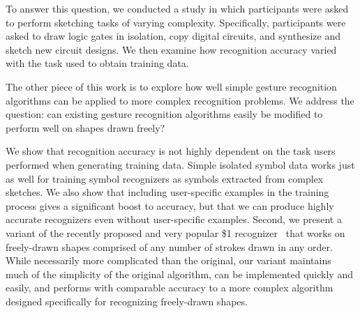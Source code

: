 \documentclass{egpubl}
\begin{document}
To answer this question, we conducted a study in which participants
were asked to perform sketching tasks of varying
complexity. Specifically, participants were asked to draw logic gates
in isolation, copy digital circuits, and synthesize and sketch new
circuit designs.  We then examine how recognition accuracy varied
with the task used to obtain training data.

The other piece of this work is to explore how well simple gesture recognition 
algorithms can be applied to more complex recognition problems.  
We address the question: can existing gesture recognition algorithms easily 
be modified to perform well on shapes drawn freely? 

We show that recognition accuracy is not highly dependent on the task
users performed when generating training data.  Simple isolated symbol
data works just as well for training symbol recognizers as symbols
extracted from complex sketches. We also show that including
user-specific examples in the training process gives a significant
boost to accuracy, but that we can produce highly accurate recognizers
even without user-specific examples.  Second, we present a variant of
the recently proposed and very popular \$1 recognizer~\cite{dollar}
that works on freely-drawn shapes comprised of any number of strokes
drawn in any order.  While necessarily more complicated than the
original, our variant maintains much of the simplicity of the original
algorithm, can be implemented quickly and easily, and performs with
comparable accuracy to a more complex algorithm designed specifically
for recognizing freely-drawn shapes.

\end{document}
